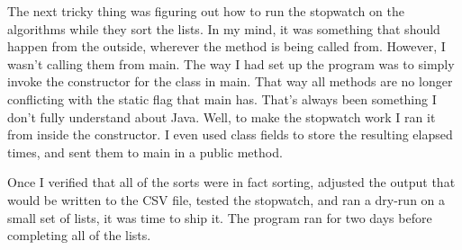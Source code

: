 The next tricky thing was figuring out how to run the stopwatch on the 
algorithms while they sort the lists. In my mind, it was something that should 
happen from the outside, wherever the method is being called from. However, I
wasn't calling them from main. The way I had set up the program was to simply
invoke the constructor for the class in main. That way all methods are no longer
conflicting with the static flag that main has. That's always been something I
don't fully understand about Java. Well, to make the stopwatch work I ran it
from inside the constructor. I even used class fields to store the resulting
elapsed times, and sent them to main in a public method.

Once I verified that all of the sorts were in fact sorting, adjusted the output
that would be written to the CSV file, tested the stopwatch, and ran a dry-run
on a small set of lists, it was time to ship it. The program ran for two days
before completing all of the lists. 
